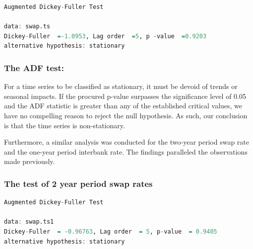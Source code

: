 \documentclass[10pt]{article}
\begin{document}
\begin{lstlisting}[language = R]
        Augmented Dickey-Fuller Test
    
data: swap.ts
Dickey-Fuller  =-1.0953, Lag order  =5, p -value  =0.9203  
alternative hypothesis: stationary    

\end{lstlisting}

\subsubsection{The ADF test:}

For a time series to be classified as stationary, it must be devoid of trends or seasonal impacts. If the procured p-value surpasses the significance level of 0.05 and the ADF statistic is greater than any of the established critical values, we have no compelling reason to reject the null hypothesis. As such, our conclusion is that the time series is non-stationary.

Furthermore, a similar analysis was conducted for the two-year period swap rate and the one-year period interbank rate. The findings paralleled the observations made previously.

\subsubsection{The test of 2 year period swap rates}

\begin{lstlisting}[language = R]
        Augmented Dickey-Fuller Test
        
data: swap.ts1
Dickey-Fuller  = -0.96763, Lag order  = 5, p-value  = 0.9405 
alternative hypothesis: stationary  

\end{lstlisting}
\end{document}
